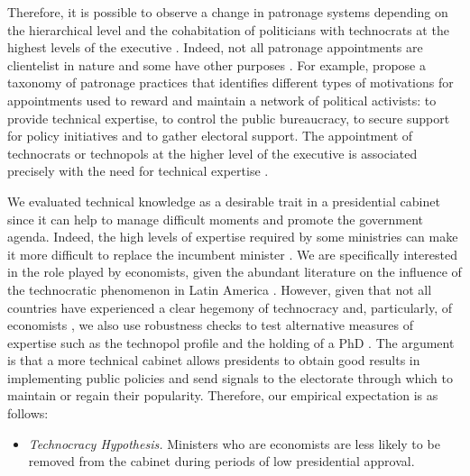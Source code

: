 \documentclass[12pt,halfline,a4paper]{ouparticle}
\begin{document}
Therefore, it is possible to observe a change in patronage systems depending on the hierarchical level and the cohabitation of politicians with technocrats at the highest levels of the executive \citep{Panizza2019}. Indeed, not all patronage appointments are clientelist in nature and some have other purposes \citep{Kopecky2016}. For example, \cite{Panizza2018} propose a taxonomy of patronage practices that identifies different types of motivations for appointments used to reward and maintain a network of political activists:  to provide technical expertise, to control the public bureaucracy, to secure support for policy initiatives and to gather electoral support. The appointment of technocrats or technopols at the higher level of the executive is associated precisely with the need for technical expertise \citep[see also][]{Joignant2011, Dargent2015}.

We evaluated technical knowledge as a desirable trait in a presidential cabinet since it can help to manage difficult moments and promote the government agenda. Indeed, the high levels of expertise required by some ministries can make it more difficult to replace the incumbent minister \citep{MartinezGallardo2014}. We are specifically interested in the role played by economists, given the abundant literature on the influence of the technocratic phenomenon in Latin America \citep[][see also \citeauthor{Camerlo2018}, \citeyear{Camerlo2018}]{Centeno1998, Silva2009}. However, given that not all countries have experienced a clear hegemony of technocracy and, particularly, of economists \citep{Dargent2015}, we also use robustness checks to test alternative measures of expertise such as the technopol profile \citep{GonzalezBustamante2018, Joignant2011} and the holding of a PhD \citep{Camerlo2015b}. The argument is that a more technical cabinet allows presidents to obtain good results in implementing public policies and send signals to the electorate through which to maintain or regain their popularity. Therefore, our empirical expectation is as follows:

\begin{itemize}
\item{{\itshape Technocracy Hypothesis.} Ministers who are economists are less likely to be removed from the cabinet during periods of low presidential approval.}
\end{itemize}
\end{document}
